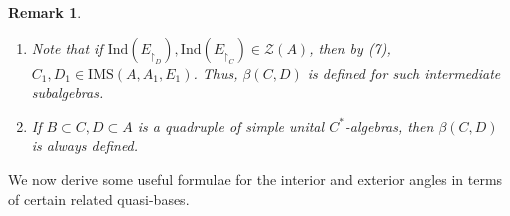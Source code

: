 \documentclass[a4]{amsart}
\newtheorem{remark}[theorem]{\bf Remark}
\numberwithin{equation}{section}
\begin{document}
\begin{remark}
  \begin{enumerate}
\item Note that if $\mathrm{Ind}(E_{\restriction_D}),
  \mathrm{Ind}(E_{\restriction_C}) \in \mathcal{Z}(A)$, then by
  (7), $C_1, D_1 \in \mathrm{IMS}(A, A_1, E_1)$. Thus,
  $\beta(C,D)$ is defined for such intermediate subalgebras.
\item If $B \subset C, D \subset A$ is a quadruple of simple unital
  $C^*$-algebras, then $\beta(C,D)$ is always defined.
  \end{enumerate}
  \end{remark}

We now derive some useful formulae for the interior and exterior
angles in terms of certain related quasi-bases.
\end{document}
